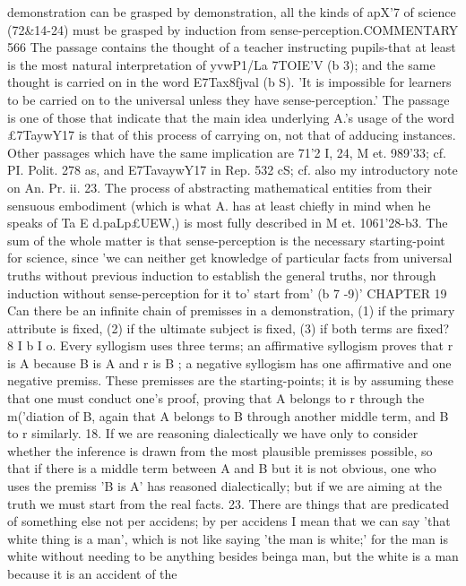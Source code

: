 {{{{{{{{{{{{{{{{demonstration can be grasped by demonstration, all the kinds
of apX'7 of science (72&14-24) must be grasped by induction from
sense-perception.COMMENTARY
566
The passage contains the thought of a teacher instructing
pupils-that at least is the most natural interpretation of yvwP1/La
7TOIE'V (b 3); and the same thought is carried on in the word
E7Tax8fjval (b S). 'It is impossible for learners to be carried on to
the universal unless they have sense-perception.' The passage
is one of those that indicate that the main idea underlying A.'s
usage of the word £7TaywY17 is that of this process of carrying on,
not that of adducing instances. Other passages which have the
same implication are 71'2 I, 24, M et. 989'33; cf. PI. Polit. 278 as,
and E7TavaywY17 in Rep. 532 cS; cf. also my introductory note on
An. Pr. ii. 23. The process of abstracting mathematical entities
from their sensuous embodiment (which is what A. has at least
chiefly in mind when he speaks of Ta E{ d.paLp£UEW,) is most fully
described in M et. 1061'28-b3.
The sum of the whole matter is that sense-perception is the
necessary starting-point for science, since 'we can neither get
knowledge of particular facts from universal truths without
previous induction to establish the general truths, nor through
induction without sense-perception for it to' start from' (b 7 -9)'
CHAPTER 19
Can there be an infinite chain of premisses in a demonstration,
(1) if the primary attribute is fixed, (2) if the ultimate subject is fixed,
(3) if both terms are fixed?
8 I b I o. Every syllogism uses three terms; an affirmative
syllogism proves that r is A because B is A and r is B ; a negative
syllogism has one affirmative and one negative premiss. These
premisses are the starting-points; it is by assuming these that
one must conduct one's proof, proving that A belongs to r
through the m('diation of B, again that A belongs to B through
another middle term, and B to r similarly.
18. If we are reasoning dialectically we have only to consider
whether the inference is drawn from the most plausible premisses
possible, so that if there is a middle term between A and B but
it is not obvious, one who uses the premiss 'B is A' has reasoned
dialectically; but if we are aiming at the truth we must start from
the real facts.
23. There are things that are predicated of something else
not per accidens; by per accidens I mean that we can say 'that
white thing is a man', which is not like saying 'the man is white;'
for the man is white without needing to be anything besides beinga man, but the white is a man because it is an accident of the
}}}}}}}}}}}}}}}}}
